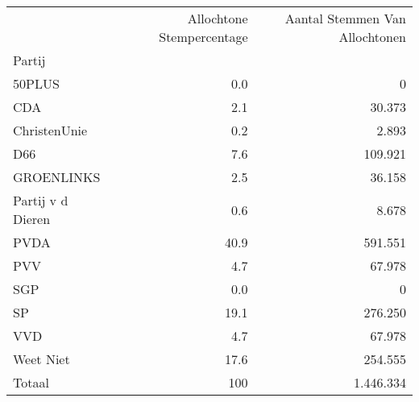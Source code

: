 \begin{tabular}{lrr}
\toprule
 &  Allochtone Stempercentage  &  Aantal Stemmen Van Allochtonen \\
Partij                &                        &                                 \\
\midrule
50PLUS                &                 0.0 &                               0 \\
CDA                   &                 2.1 &                           30.373 \\
ChristenUnie          &                 0.2 &                            2.893 \\
D66                   &                 7.6 &                          109.921 \\
GROENLINKS            &                 2.5 &                           36.158 \\
Partij v d Dieren &                 0.6 &                            8.678 \\
PVDA                  &                40.9 &                          591.551 \\
PVV                   &                4.7 &                           67.978 \\
SGP                   &                 0.0 &                               0 \\
SP                    &                19.1 &                          276.250 \\
VVD                   &                4.7 &                           67.978 \\
Weet Niet		      & 				17.6 & 						254.555 \\
\midrule
Totaal				&					100	&						1.446.334\\
\bottomrule
\end{tabular}

